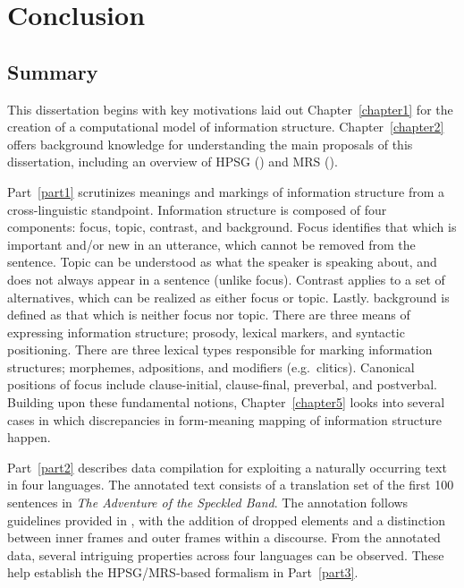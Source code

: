 \chapter{Conclusion}
\label{chapter15}
\setcounter{enums}{0}

\section{Summary}
\label{15:sec:summary}


This dissertation begins with key motivations laid out
Chapter~\ref{chapter1} for the creation of a computational model of
information structure. Chapter~\ref{chapter2} offers background
knowledge for understanding the main proposals of this dissertation,
including an overview of HPSG (\citealt{pollard:sag:94}) and MRS
(\citealt{copestake:etal:05}).

Part~\ref{part1} scrutinizes meanings and markings of information
structure from a cross-linguistic standpoint. Information structure is
composed of four components: focus, topic, contrast, and
background. Focus identifies that which is important and/or new in an
utterance, which cannot be removed from the sentence. Topic can be
understood as what the speaker is speaking about, and does not always
appear in a sentence (unlike focus). Contrast applies to a set of
alternatives, which can be realized as either focus or
topic. Lastly. background is defined as that which is neither focus
nor topic. There are three means of expressing information structure;
prosody, lexical markers, and syntactic positioning. There are three
lexical types responsible for marking information structures;
morphemes, adpositions, and modifiers (e.g.\ clitics). Canonical
positions of focus include clause-initial, clause-final, preverbal,
and postverbal. Building upon these fundamental notions,
Chapter~\ref{chapter5} looks into several cases in which discrepancies
in form-meaning mapping of information structure happen.

Part~\ref{part2} describes data compilation for exploiting a naturally
occurring text in four languages. The annotated text consists of a
translation set of the first 100 sentences in \textit{The Adventure of
  the Speckled Band}. The annotation follows guidelines provided in
\citet{dipper:etal:07}, with the addition of dropped elements and a
distinction between inner frames and outer frames within a discourse.
From the annotated data, several intriguing properties across four
languages can be observed. These help establish the HPSG/MRS-based
formalism in Part~\ref{part3}.

